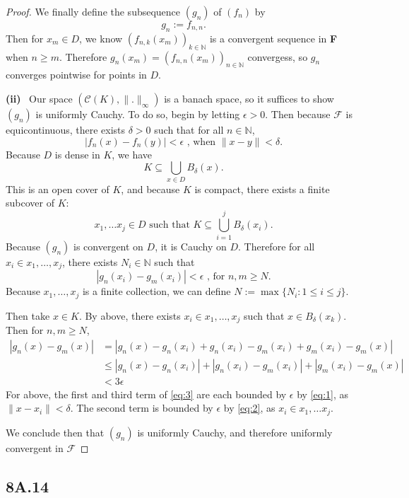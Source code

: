 \documentclass[12pt]{amsart}
\newcommand{\N}{\mathbb{N}}
\newcommand{\eq}[1]{\begin{equation*}#1\end{equation*}}
\newcommand{\qeq}[1]{\begin{equation}#1\end{equation}}
\newcommand{\qal}[1]{\begin{align}#1\end{align}}
\newcommand{\<}{\langle}
\renewcommand{\>}{\rangle}
\renewcommand{\-}[1]{\overline{#1}}
\begin{document}
\begin{itemize}
\begin{proof}
            We finally define the subsequence $(g_n)$ of $(f_n)$ by
            \eq{g_n := f_{n, n}.}
            Then for $x_m \in D$, we know $(f_{n, k} (x_m))_{k \in \N}$ is a convergent sequence in \textbf{F} when $n \geq m$. Therefore $ g_n(x_m) = (f_{n, n} (x_m))_{n \in \N}$ convergess, so $g_n$ converges pointwise for points in $D$.

            \textbf{(ii)}~ Our space $(\mathcal{C}(K), \|.\|_\infty)$ is a banach space, so it suffices to show $(g_n)$ is uniformly Cauchy. To do so, begin by letting $\epsilon > 0$. Then because $\mathcal{F}$ is equicontinuous, there exists $\delta > 0$ such that for all $n \in \N$, 
            \qeq{|f_n(x) - f_n(y)| < \epsilon \text{ , when } \|x - y \| < \delta. \label{eq:1}}
            Because $D$ is dense in $K$, we have
            \eq{K \subseteq \bigcup_{x \in D} B_\delta (x).}
            This is an open cover of $K$, and because $K$ is compact, there exists a finite subcover of $K$: 
            \eq{x_1, \dots x_j \in D \text{ such that } K \subseteq \bigcup_{i=1}^j B_\delta(x_i).}
            Because $(g_n)$ is convergent on $D$, it is Cauchy on $D$. Therefore for all $x_i \in x_1, \dots, x_j$, there exists $N_i \in \N$ such that
            \qeq{|g_n(x_i) - g_m(x_i)| < \epsilon \text{ , for $n, m \geq N$.} \label{eq:2}}
            Because $x_1, \dots, x_j$ is a finite collection, we can define $N := \max \{N_i : 1 \leq i \leq j\}$.
            
            Then take $x \in K$. By above, there exists $x_i \in x_1, \dots, x_j$ such that $x \in B_\delta(x_k)$. Then for $n, m \geq N$,
            \qal{|g_n(x) - g_m(x)| &= |g_n(x) - g_n(x_i) + g_n(x_i) - g_m(x_i) + g_m(x_i) - g_m(x)| \nonumber \\
            &\leq |g_n(x) - g_n(x_i)| + |g_n(x_i) - g_m(x_i)| + |g_m(x_i) - g_m(x)| \label{eq:3} \\
            &< 3 \epsilon \nonumber}
            For above, the first and third term of \eqref{eq:3} are each bounded by $\epsilon$ by \eqref{eq:1}, as $\|x - x_i\| < \delta$. The second term is bounded by $\epsilon$ by \eqref{eq:2}, as $x_i \in x_1, \dots x_j$.

            We conclude then that $(g_n)$ is uniformly Cauchy, and therefore uniformly convergent in $\mathcal{F}$
        \end{proof}
    \end{itemize}

    \subsection{8A.14}
\end{document}
